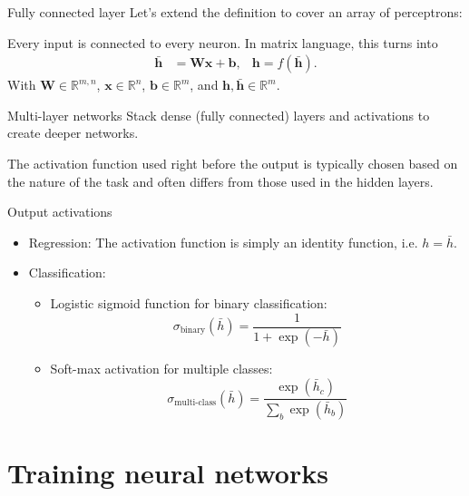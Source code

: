 \documentclass{beamer}
\begin{document}
    \begin{frame}{Fully connected layer}
      Let's extend the definition to cover an array of perceptrons:
      \begin{figure}
        
      \end{figure}
      Every input is connected to every neuron. In matrix language, this turns into
      \begin{align}
        \bar{\mathbf{h}} &= \mathbf{W}\mathbf{x} + \mathbf{b}, & \mathbf{h} = f(\bar{\mathbf{h}}).
      \end{align}
      With $\mathbf{W} \in \mathbb{R}^{m,n}$, $\mathbf{x} \in \mathbb{R}^{n}$, $\mathbf{b} \in \mathbb{R}^{m}$, and $\mathbf{h}, \bar{\mathbf{h}} \in \mathbb{R}^m$.
    \end{frame}
		
		\begin{frame}{Multi-layer networks}
      Stack dense (fully connected) layers and activations to create deeper networks. \\
      \begin{figure}
         
      \end{figure}	%
			The activation function used right before the output is typically chosen based on the nature of the task and often differs from those used in the hidden layers.
    \end{frame}
		
		\begin{frame}{Output activations}
      \begin{itemize}
				\item Regression: The activation function is simply an identity function, i.e. $h = \bar{h}$.	%
				\item Classification: 
				\begin{itemize}
					\item Logistic sigmoid function for binary classification: 
						\[\sigma_{\text{binary}}(\bar{h}) = \frac{1}{1+\exp(-\bar{h})}\]
					\item  Soft-max activation for multiple classes: 
					\[ \sigma_{\text{multi-class}}(\bar{h}) = \frac{\exp(\bar{h}_c)}{\sum_b\exp(\bar{h}_b)}\]
				\end{itemize}
			\end{itemize}
    \end{frame}
		
		\section{Training neural networks}
\end{document}
